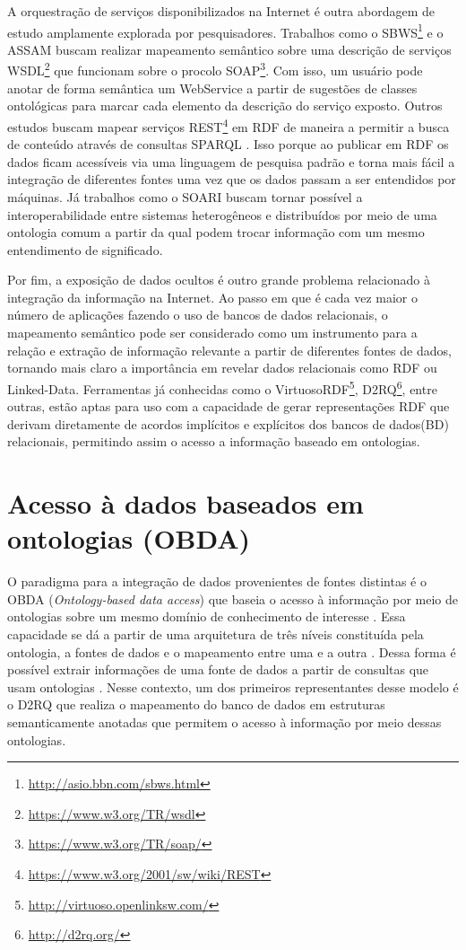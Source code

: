 A orquestração de serviços disponibilizados na Internet é outra abordagem de estudo amplamente explorada por pesquisadores. Trabalhos como o SBWS\footnote{\url{http://asio.bbn.com/sbws.html}} e o ASSAM \citep{Hess2003, Hess2004} buscam realizar mapeamento semântico sobre uma descrição de serviços WSDL\footnote{\url{https://www.w3.org/TR/wsdl}} que funcionam sobre o procolo SOAP\footnote{\url{https://www.w3.org/TR/soap/}}. Com isso, um usuário pode anotar de forma semântica um WebService a partir de sugestões de classes ontológicas para marcar cada elemento da descrição do serviço exposto. Outros estudos buscam mapear serviços REST\footnote{\url{https://www.w3.org/2001/sw/wiki/REST}} em RDF de maneira a permitir a busca de conteúdo através de consultas SPARQL \citep{Battle2008}. Isso porque ao publicar em RDF os dados ficam acessíveis via uma linguagem de pesquisa padrão \citep{W3C_SPARQL} e torna mais fácil a integração de diferentes fontes uma vez que os dados passam a ser entendidos por máquinas\citep{Heath2008}. Já trabalhos como o SOARI \citep{Nardin2011} buscam tornar possível a interoperabilidade entre sistemas heterogêneos e distribuídos por meio de uma ontologia comum a partir da qual podem trocar informação com um mesmo entendimento de significado. 

Por fim, a exposição de dados ocultos é outro grande problema relacionado à integração da informação na Internet. Ao passo em que é cada vez maior o número de aplicações fazendo o uso de bancos de dados relacionais, o mapeamento semântico pode ser considerado como um instrumento para a relação e extração de informação relevante a partir de diferentes fontes de dados, tornando mais claro a importância em revelar dados relacionais como RDF ou Linked-Data\cite{Hellmann2009}. Ferramentas já conhecidas como o VirtuosoRDF\footnote{\url{http://virtuoso.openlinksw.com/}}, D2RQ\footnote{\url{http://d2rq.org/}}, entre outras, estão aptas para uso com a capacidade de gerar representações RDF que derivam diretamente de acordos implícitos e explícitos dos bancos de dados(BD) relacionais\citep{Hellmann2009}, permitindo assim o acesso a informação baseado em ontologias.

\section{Acesso à dados baseados em ontologias (OBDA)}
\label{sec:odba}

O paradigma para a integração de dados provenientes de fontes distintas é o OBDA (\emph{Ontology-based data access}) que baseia o acesso à informação por meio de ontologias sobre um mesmo domínio de conhecimento de interesse \citep{Civili2013, Lembo2014, Bienvenu2013}. Essa capacidade se dá a partir de uma arquitetura de três níveis constituída pela ontologia, a fontes de dados e o mapeamento entre uma e a outra \citep{Lembo2014, Civili2013}. Dessa forma é possível extrair informações de uma fonte de dados a partir de consultas que usam ontologias \citep{Bienvenu2013}. Nesse contexto, um dos primeiros representantes desse modelo é o D2RQ que realiza o mapeamento do banco de dados em estruturas semanticamente anotadas que permitem o acesso à informação por meio dessas ontologias.

